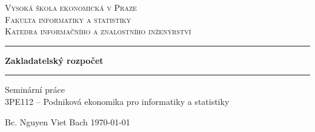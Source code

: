 \begin{titlepage}
\begin{center}

\textsc{\LARGE Vysoká škola ekonomická v Praze}\\[0.5cm]
\textsc{\large Fakulta informatiky a statistiky}\\[0.5cm]
\textsc{\large Katedra informačního a znalostního inženýrství}\\[0.5cm]

\vfill

\hrule
\vspace{0.6cm}
\huge {\bfseries Zakladatelský rozpočet}
\vspace{0.4cm}
\hrule
\vspace{0.4cm}
\large Seminární práce \\ 3PE112 -- Podniková ekonomika pro informatiky a statistiky\\[0.3cm]

\vfill

\large Bc. Nguyen Viet Bach \hfill \today

\end{center}
\end{titlepage}

